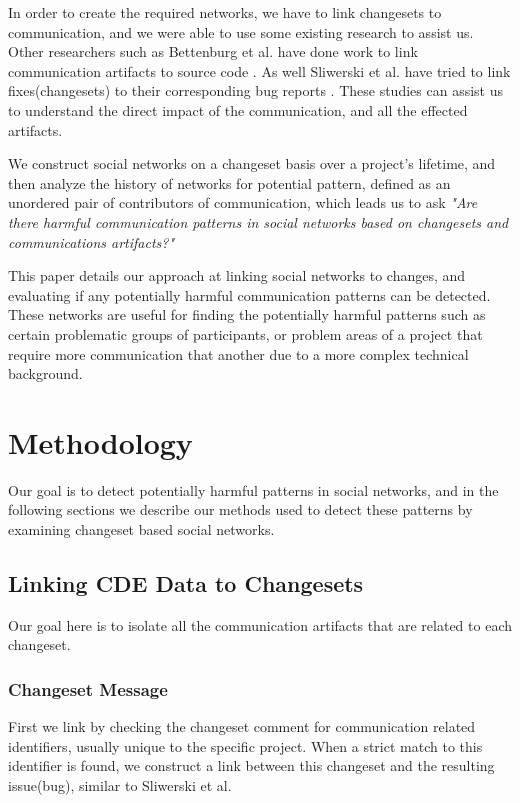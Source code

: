 \documentclass[conference]{IEEEtran}
\begin{document}
In order to create the required networks, we have to link changesets to communication, and we were able to use some existing research to assist us.  Other researchers such as Bettenburg et al. have done work to link communication artifacts to source code \cite{Bettenburg:2008:ESI:1370750.1370757}.  As well Sliwerski et al. have tried to link fixes(changesets) to their corresponding bug reports \cite{Sliwerski:2005:CIF:1083142.1083147}.  These studies can assist us to understand the direct impact of the communication, and all the effected artifacts.  

We construct social networks on a changeset basis over a project's lifetime, and then analyze the history of networks for potential pattern, defined as an unordered pair of contributors of communication, which leads us to ask \textit{"Are there harmful communication patterns in social networks based on changesets and communications artifacts?"} 

This paper details our approach at linking social networks to changes, and evaluating if any potentially harmful communication patterns can be detected.  These networks are useful for finding the potentially harmful patterns such as certain problematic groups of participants, or problem areas of a project that require more communication that another due to a more complex technical background. 

\section{Methodology}
Our goal is to detect potentially harmful patterns in social networks, and in the following sections we describe our methods used to detect these patterns by examining changeset based social networks.

\subsection{Linking CDE Data to Changesets}
Our goal here is to isolate all the communication artifacts that are related to each changeset.  
\subsubsection{Changeset Message}
First we link by checking the changeset comment for communication related identifiers, usually unique to the specific project.  When a strict match to this identifier is found, we construct a link between this changeset and the resulting issue(bug), similar to Sliwerski et al. \cite{Sliwerski:2005:CIF:1083142.1083147}
\end{document}
